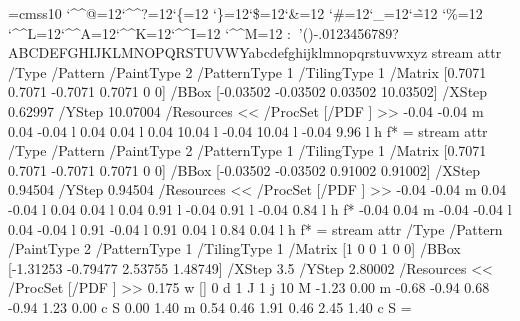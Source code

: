 \font\THFa=cmss10
\begingroup
\catcode`\^^@=12\catcode`\^^?=12\catcode`\{=12
\catcode`\}=12\catcode`\$=12\catcode`\&=12
\catcode`\#=12\catcode`\_=12\catcode`\~=12
\catcode`\%=12
\catcode`\^^L=12\catcode`\^^A=12\catcode`\^^K=12\catcode`\^^I=12
\catcode`\^^M=12
\THFa:^^K^^L'()-.0123456789?ABCDEFGHIJKLMNOPQRSTUVWYabcdefghijklmnopqrstuvwxyz\endinclude\endgroup
\immediate\pdfobj stream attr {/Type /Pattern
/PaintType 2 /PatternType 1 /TilingType 1
/Matrix [0.7071 0.7071 -0.7071 0.7071 0 0]
/BBox [-0.03502 -0.03502 0.03502 10.03502]
/XStep 0.62997
/YStep 10.07004
/Resources << /ProcSet [/PDF ] >> } {
-0.04 -0.04 m
0.04 -0.04 l
0.04 0.04 l
0.04 10.04 l
-0.04 10.04 l
-0.04 9.96 l
h
f*
} \newcount \THPa\THPa=\pdflastobj
\immediate\pdfobj stream attr {/Type /Pattern
/PaintType 2 /PatternType 1 /TilingType 1
/Matrix [0.7071 0.7071 -0.7071 0.7071 0 0]
/BBox [-0.03502 -0.03502 0.91002 0.91002]
/XStep 0.94504
/YStep 0.94504
/Resources << /ProcSet [/PDF ] >> } {
-0.04 -0.04 m
0.04 -0.04 l
0.04 0.04 l
0.04 0.91 l
-0.04 0.91 l
-0.04 0.84 l
h
f*
-0.04 0.04 m
-0.04 -0.04 l
0.04 -0.04 l
0.91 -0.04 l
0.91 0.04 l
0.84 0.04 l
h
f*
} \newcount \THPc\THPc=\pdflastobj
\immediate\pdfobj stream attr {/Type /Pattern
/PaintType 2 /PatternType 1 /TilingType 1
/Matrix [1 0 0 1 0 0]
/BBox [-1.31253 -0.79477 2.53755 1.48749]
/XStep 3.5
/YStep 2.80002
/Resources << /ProcSet [/PDF ] >> } {
0.175 w
[] 0 d
1 J
1 j
10 M
-1.23 0.00 m
-0.68 -0.94 0.68 -0.94 1.23 0.00 c
S
0.00 1.40 m
0.54 0.46 1.91 0.46 2.45 1.40 c
S
} \newcount \THPb\THPb=\pdflastobj

